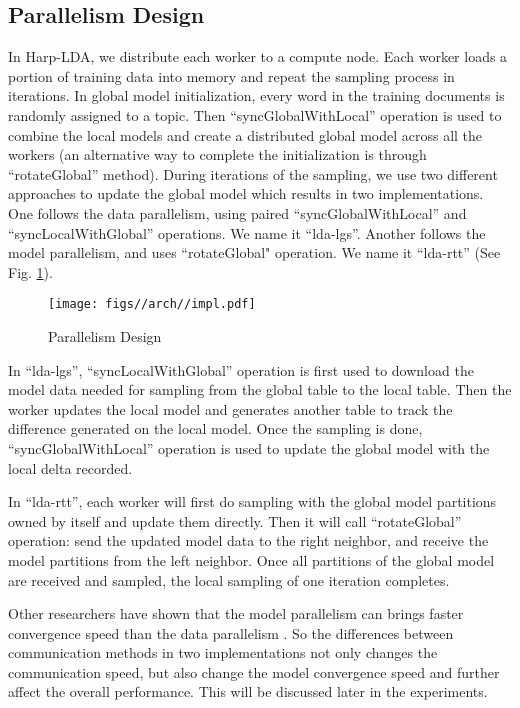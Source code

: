 \documentclass[conference]{IEEEtran}
\begin{document}
\subsection{Parallelism Design}
In Harp-LDA, we distribute each worker to a compute node. 
Each worker loads a portion of training data into memory
and repeat the sampling process in iterations. 
In global model initialization, 
every word in the training documents is randomly assigned to a topic.
Then ``syncGlobalWithLocal'' operation is used to combine the local models
and create a distributed global model across all the workers
(an alternative way to complete the initialization is through ``rotateGlobal'' method).
During iterations of the sampling,
we use two different approaches to update the global model 
which results in two implementations. 
One follows the data parallelism,
using paired ``syncGlobalWithLocal'' and ``syncLocalWithGlobal'' operations.
We name it ``lda-lgs''.
Another follows the model parallelism, and uses ``rotateGlobal" operation.
We name it ``lda-rtt'' (See Fig. \ref{fig:2}).
\begin{figure}
	\centering
	\texttt{[image: figs//arch//impl.pdf]}
	\caption{Parallelism Design}
	\label{fig:2}
\end{figure}

In ``lda-lgs'',  
``syncLocalWithGlobal'' operation is first used
to download the model data needed for sampling
from the global table to the local table. 
Then the worker updates the local model 
and generates another table to track the difference generated on the local model.
Once the sampling is done, 
``syncGlobalWithLocal'' operation 
is used to update the global model with the local delta recorded. 

In ``lda-rtt'', 
each worker will first do sampling
with the global model partitions owned by itself
and update them directly. 
Then it will call ``rotateGlobal'' operation: 
send the updated model data to the right neighbor,
and receive the model partitions from the left neighbor.
Once all partitions of the global model are received and sampled,
the local sampling of one iteration completes.

Other researchers have shown that the model parallelism can brings
faster convergence speed than the data parallelism \cite{21}.
So the differences between communication methods in two implementations
not only changes the communication speed,
but also change the model convergence speed
and further affect the overall performance. 
This will be discussed later in the experiments.
%
\end{document}
